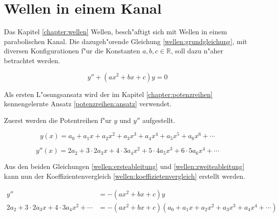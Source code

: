 \chapter{Wellen in einem Kanal\label{chapter:wellen}}
\begin{refsection}

Das Kapitel \ref{chapter:wellen} Wellen, besch"aftigt sich mit Wellen in einem 
parabolischen Kanal. Die dazugeh"orende Gleichung \ref{wellen:grundgleichung}, 
mit diversen Konfigurationen f"ur die Konstanten ${a,b,c} \in \mathbb{R}$, soll 
dazu n"aher betrachtet werden.

\begin{equation}
	y'' + (ax^2+bx+c)y
	=
	0
	\label{wellen:grundgleichung}
\end{equation}

Als ersten L"osungsansatz wird der im Kapitel \ref{chapter:potenzreihen} 
kennengelernte Ansatz \ref{potenzreihen:ansatz} verwendet.

Zuerst werden die Potentreihen f"ur $y$ und $y''$ aufgestellt.

\begin{equation}
	y(x)
	=
	a_0 + a_1x + a_2x^2 + a_3x^3 + a_4x^4 + a_5x^5 + a_6x^6 + \dotsb
	\label{wellen:ersteableitung}
\end{equation}

\begin{equation}
	y''(x)
	=
	2a_2 + 3 \mathbin{\cdot} 2a_3x + 4 \mathbin{\cdot} 3a_4x^2 + 5 
	\mathbin{\cdot} 4a_5x^3 + 6 \mathbin{\cdot} 5a_6x^4 + \dotsb
	\label{wellen:zweiteableitung}
\end{equation}

Aus den beiden Gleichungen \ref{wellen:ersteableitung} und 
\ref{wellen:zweiteableitung} kann nun der Koeffizientenvergleich 
\ref{wellen:koeffizietenvergleich} erstellt werden.

\begin{equation}
	\begin{split}
		y''
		&=
		-(ax^2+bx+c)y \\
		2a_2 + 3 \mathbin{\cdot} 2a_3x + 4 \mathbin{\cdot} 3a_4x^2 + \dotsb
		&=
		-(ax^2+bx+c)(a_0 + a_1x + a_2x^2 + a_3x^3 + a_4x^4 + \dotsb)
	\end{split}
	\label{wellen:koeffizietenvergleich}
\end{equation}

\printbibliography[heading=subbibliography]
\end{refsection}